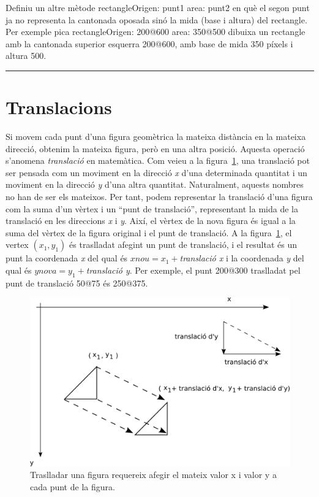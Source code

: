 \begin{center}
\colorbox{black}{}
\end{center}
{\small
\noindent
Definiu un altre mètode \textsf{rectangleOrigen: punt1 area: punt2} en què el segon punt ja no representa la cantonada oposada sinó la mida (base i altura) del rectangle. Per exemple \textsf{pica rectangleOrigen: 200@600 area: 350@500} dibuixa un rectangle amb la cantonada superior esquerra \textsf{200@600}, amb base de mida \textsf{350} píxels i altura \textsf{500}.}\\
\noindent
\rule{\textwidth}{3pt}

\section{Translacions}
Si movem cada punt d'una figura geomètrica la mateixa distància en la mateixa direcció, obtenim la mateixa figura, però en una altra posició. Aquesta operació s'anomena \emph{translació} en matemàtica. Com veieu a la figura~\ref{fig2103}, una translació pot ser pensada com un moviment en la direcció \emph{x} d'una determinada quantitat i un moviment en la direcció \emph{y} d'una altra quantitat. Naturalment, aquests nombres no han de ser els mateixos. Per tant, podem representar la translació d'una figura com la suma d'un vèrtex i un ``punt de translació'', representant la mida de la translació en les direccions \emph{x} i \emph{y}. Així, el vèrtex de la nova figura és igual a la suma del vèrtex de la figura original i el punt de translació. A la figura~\ref{fig2103}, el vertex $(x_1, y_1)$ és traslladat afegint un punt de translació, i el resultat és un punt la coordenada \emph{x} del qual és $xnou = x_1 +$\emph{translació x} i la coordenada \emph{y} del qual és $ynova = y_1 +$\emph{translació y}. Per exemple, el punt \textsf{200@300} traslladat pel punt de translació \textsf{50@75} és \textsf{250@375}.
\begin{figure}[h!]
\begin{center}
\includegraphics[scale=0.25]{Imatges/figura21-3}
\end{center}
\caption{Traslladar una figura requereix afegir el mateix valor x i valor y a cada punt de la figura.}
\label{fig2103}
\end{figure}

